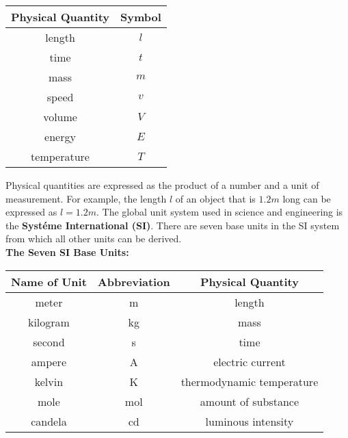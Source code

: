         \begin{center}
            \begin{tabular}{|c|c|}
                \hline
                \textbf{Physical Quantity}  & \textbf{Symbol} \\
                \hline
                length                      & $l$ \\
                \hline
                time                        & $t$ \\
                \hline
                mass                        & $m$ \\
                \hline
                speed                       & $v$ \\
                \hline
                volume                      & $V$ \\
                \hline
                energy                      & $E$ \\
                \hline
                temperature                 & $T$ \\
                \hline
            \end{tabular}
        \end{center}

        \noindent Physical quantities are expressed as the product of a number and a unit of measurement. For example, the length $l$ of an object that is $1.2 m$ long can be expressed as $l=1.2m$. The global unit system
        used in science and engineering is the \textbf{Syst\'eme International (SI)}. There are seven base units in the SI system from which all other units can be derived. \\

        \noindent \textbf{The Seven SI Base Units:}

        \begin{center}
            \begin{tabular}{|c|c|c|}
                \hline
                \textbf{Name of Unit}   & \textbf{Abbreviation} & \textbf{Physical Quantity} \\
                \hline
                meter                   & m                     & length \\
                \hline
                kilogram                & kg                    & mass \\
                \hline
                second                  & s                     & time \\
                \hline
                ampere                  & A                     & electric current \\
                \hline
                kelvin                  & K                     & thermodynamic temperature \\
                \hline
                mole                    & mol                   & amount of substance \\
                \hline
                candela                 & cd                    & luminous intensity \\
                \hline
            \end{tabular}
        \end{center}

